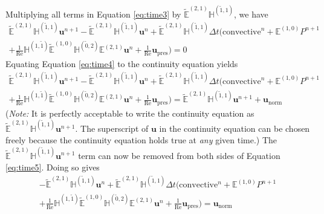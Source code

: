 Multiplying all terms in Equation \eqref{eq:time3} by $\tilde{\mathbb{E}}^{(2,1)} \mathbb{H}^{(\tilde{1},1)}$, we have
\begin{multline}
    \label{eq:time4}
    \tilde{\mathbb{E}}^{(2,1)} \mathbb{H}^{(\tilde{1},1)} \mathbf{u}^{n+1} - \tilde{\mathbb{E}}^{(2,1)} \mathbb{H}^{(\tilde{1},1)} \mathbf{u}^{n} + \tilde{\mathbb{E}}^{(2,1)} \mathbb{H}^{(\tilde{1},1)} \Delta t \biggl( \text{convective}^{n} + \mathbb{E}^{(1,0)} P^{n+1} \\
    + \frac{1}{\text{Re}} \mathbb{H}^{(1,\tilde{1})} \tilde{\mathbb{E}}^{(1,0)} \mathbb{H}^{(\tilde{0},2)} \mathbb{E}^{(2,1)} \mathbf{u}^{n} + \frac{1}{\text{Re}} \mathbf{u}_{\text{pres}} \biggr) = 0
\end{multline}
Equating Equation \eqref{eq:time4} to the continuity equation yields
\begin{multline}
    \label{eq:time5}
    \tilde{\mathbb{E}}^{(2,1)} \mathbb{H}^{(\tilde{1},1)} \mathbf{u}^{n+1} - \tilde{\mathbb{E}}^{(2,1)} \mathbb{H}^{(\tilde{1},1)} \mathbf{u}^{n} +  \tilde{\mathbb{E}}^{(2,1)} \mathbb{H}^{(\tilde{1},1)} \Delta t \biggl( \text{convective}^{n} + \mathbb{E}^{(1,0)} P^{n+1} \\
    + \frac{1}{\text{Re}} \mathbb{H}^{(1,\tilde{1})} \tilde{\mathbb{E}}^{(1,0)} \mathbb{H}^{(\tilde{0},2)} \mathbb{E}^{(2,1)} \mathbf{u}^{n} + \frac{1}{\text{Re}} \mathbf{u}_{\text{pres}} \biggr) = \tilde{\mathbb{E}}^{(2,1)} \mathbb{H}^{(\tilde{1},1)} \mathbf{u}^{n+1} + \mathbf{u}^{}_{\text{norm}}
\end{multline}
(\textit{Note:} It is perfectly acceptable to write the continuity equation as $\tilde{\mathbb{E}}^{(2,1)} \mathbb{H}^{(\tilde{1},1)} \mathbf{u}^{n+1}$. The superscript of $\mathbf{u}$ in the continuity equation can be chosen freely because the continuity equation holds true at \emph{any} given time.) The $\tilde{\mathbb{E}}^{(2,1)} \mathbb{H}^{(\tilde{1},1)} \mathbf{u}^{n+1}$ term can now be removed from both sides of Equation \eqref{eq:time5}. Doing so gives
\begin{multline}
    \label{eq:time6}
    - \tilde{\mathbb{E}}^{(2,1)} \mathbb{H}^{(\tilde{1},1)} \mathbf{u}^{n} +
    \tilde{\mathbb{E}}^{(2,1)} \mathbb{H}^{(\tilde{1},1)} \Delta t \biggl( \text{convective}^{n} + \mathbb{E}^{(1,0)} P^{n+1} \\
    + \frac{1}{\text{Re}} \mathbb{H}^{(1,\tilde{1})} \tilde{\mathbb{E}}^{(1,0)} \mathbb{H}^{(\tilde{0},2)} \mathbb{E}^{(2,1)} \mathbf{u}^{n} + \frac{1}{\text{Re}} \mathbf{u}_{\text{pres}} \biggr) = \mathbf{u}^{}_{\text{norm}}
\end{multline}
